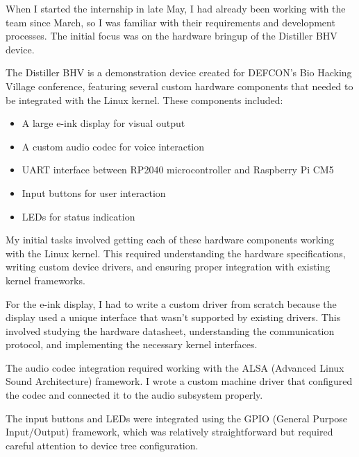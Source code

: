 \documentclass[12pt,a4paper]{report}
\begin{document}
When I started the internship in late May, I had already been working with the team since March, so I was familiar with their requirements and development processes. The initial focus was on the hardware bringup of the Distiller BHV device.

\vspace{0.3cm}

The Distiller BHV is a demonstration device created for DEFCON's Bio Hacking Village conference, featuring several custom hardware components that needed to be integrated with the Linux kernel. These components included:

\begin{itemize}[itemsep=0.2cm]
    \item A large e-ink display for visual output
    \item A custom audio codec for voice interaction
    \item UART interface between RP2040 microcontroller and Raspberry Pi CM5
    \item Input buttons for user interaction
    \item LEDs for status indication
\end{itemize}

\vspace{0.3cm}

My initial tasks involved getting each of these hardware components working with the Linux kernel. This required understanding the hardware specifications, writing custom device drivers, and ensuring proper integration with existing kernel frameworks.

\vspace{0.3cm}

For the e-ink display, I had to write a custom driver from scratch because the display used a unique interface that wasn't supported by existing drivers. This involved studying the hardware datasheet, understanding the communication protocol, and implementing the necessary kernel interfaces.

\vspace{0.3cm}

The audio codec integration required working with the ALSA (Advanced Linux Sound Architecture) framework. I wrote a custom machine driver that configured the codec and connected it to the audio subsystem properly.

\vspace{0.3cm}

The input buttons and LEDs were integrated using the GPIO (General Purpose Input/Output) framework, which was relatively straightforward but required careful attention to device tree configuration.
\end{document}
